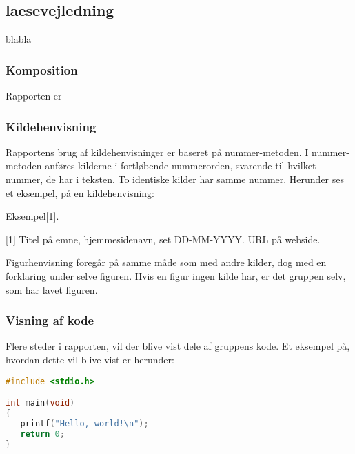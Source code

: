 \subsection{laesevejledning}
blabla

\subsubsection{Komposition}
Rapporten er 

\subsubsection{Kildehenvisning}
Rapportens brug af kildehenvisninger er baseret på nummer-metoden. I nummer-metoden anføres kilderne i fortløbende nummerorden, svarende til hvilket nummer, de har i teksten. To identiske kilder har samme nummer. Herunder ses et eksempel, på en kildehenvisning:

Eksempel[1].

[1] Titel på emne, hjemmesidenavn, set DD-MM-YYYY.
	URL på webside.

Figurhenvisning foregår på samme måde som med andre kilder, dog med en forklaring under selve figuren. Hvis en figur ingen kilde har, er det gruppen selv, som har lavet figuren.


\subsubsection{Visning af kode}
Flere steder i rapporten, vil der blive vist dele af gruppens kode. Et eksempel på, hvordan dette vil blive vist er herunder:

\begin{lstlisting}[language=C, caption=Kodeeksempel i C]
#include <stdio.h>

int main(void)
{
   printf("Hello, world!\n");
   return 0;
}
\end{lstlisting}
